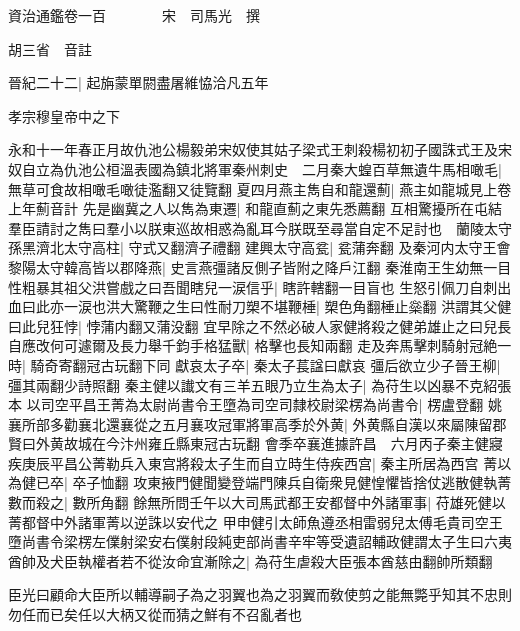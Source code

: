 資治通鑑卷一百　　　　宋　司馬光　撰

胡三省　音註

晉紀二十二|{
	起旃蒙單閼盡屠維恊洽凡五年}


孝宗穆皇帝中之下

永和十一年春正月故仇池公楊毅弟宋奴使其姑子梁式王刺殺楊初初子國誅式王及宋奴自立為仇池公桓溫表國為鎮北將軍秦州刺史　二月秦大蝗百草無遺牛馬相噉毛|{
	無草可食故相噉毛噉徒濫翻又徒覽翻}
夏四月燕主雋自和龍還薊|{
	燕主如龍城見上卷上年薊音計}
先是幽冀之人以雋為東遷|{
	和龍直薊之東先悉薦翻}
互相驚擾所在屯結羣臣請討之雋曰羣小以朕東巡故相惑為亂耳今朕既至尋當自定不足討也　蘭陵太守孫黑濟北太守高柱|{
	守式又翻濟子禮翻}
建興太守高瓫|{
	瓫蒲奔翻}
及秦河内太守王會黎陽太守韓高皆以郡降燕|{
	史言燕彊諸反側子皆附之降戶江翻}
秦淮南王生幼無一目性粗暴其祖父洪嘗戲之曰吾聞瞎兒一涙信乎|{
	瞎許轄翻一目盲也}
生怒引佩刀自刺出血曰此亦一涙也洪大驚鞭之生曰性耐刀槊不堪鞭棰|{
	槊色角翻棰止橤翻}
洪謂其父健曰此兒狂悖|{
	悖蒲内翻又蒲没翻}
宜早除之不然必破人家健將殺之健弟雄止之曰兒長自應改何可遽爾及長力舉千鈞手格猛獸|{
	格擊也長知兩翻}
走及奔馬擊刺騎射冠絶一時|{
	騎奇寄翻冠古玩翻下同}
獻哀太子卒|{
	秦太子萇諡曰獻哀}
彊后欲立少子晉王柳|{
	彊其兩翻少詩照翻}
秦主健以䜟文有三羊五眼乃立生為太子|{
	為苻生以凶暴不克紹張本}
以司空平昌王菁為太尉尚書令王墮為司空司隸校尉梁楞為尚書令|{
	楞盧登翻}
姚襄所部多勸襄北還襄從之五月襄攻冠軍將軍高季於外黄|{
	外黄縣自漢以來屬陳留郡賢曰外黄故城在今汴州雍丘縣東冠古玩翻}
會季卒襄進據許昌　六月丙子秦主健寢疾庚辰平昌公菁勒兵入東宫將殺太子生而自立時生侍疾西宫|{
	秦主所居為西宫}
菁以為健已卒|{
	卒子恤翻}
攻東掖門健聞變登端門陳兵自衛衆見健惶懼皆捨仗逃散健執菁數而殺之|{
	數所角翻}
餘無所問壬午以大司馬武都王安都督中外諸軍事|{
	苻雄死健以菁都督中外諸軍菁以逆誅以安代之}
甲申健引太師魚遵丞相雷弱兒太傅毛貴司空王墮尚書令梁楞左㒒射梁安右僕射段純吏部尚書辛牢等受遺詔輔政健謂太子生曰六夷酋帥及犬臣執權者若不從汝命宜漸除之|{
	為苻生虐殺大臣張本酋慈由翻帥所類翻}


臣光曰顧命大臣所以輔導嗣子為之羽翼也為之羽翼而敎使剪之能無斃乎知其不忠則勿任而已矣任以大柄又從而猜之鮮有不召亂者也

